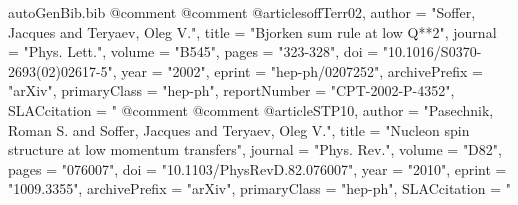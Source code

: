 \begin{filecontents*}{autoGenBib.bib}
@comment %
@comment %
@article{soffTerr02,
      author         = "Soffer, Jacques and Teryaev, Oleg V.",
      title          = "{Bjorken sum rule at low Q**2}",
      journal        = "Phys. Lett.",
      volume         = "B545",
      pages          = "323-328",
      doi            = "10.1016/S0370-2693(02)02617-5",
      year           = "2002",
      eprint         = "hep-ph/0207252",
      archivePrefix  = "arXiv",
      primaryClass   = "hep-ph",
      reportNumber   = "CPT-2002-P-4352",
      SLACcitation   = "%
}
@comment %
@comment %
@article{STP10,
      author         = "Pasechnik, Roman S. and Soffer, Jacques and Teryaev, Oleg V.",
      title          = "{Nucleon spin structure at low momentum transfers}",
      journal        = "Phys. Rev.",
      volume         = "D82",
      pages          = "076007",
      doi            = "10.1103/PhysRevD.82.076007",
      year           = "2010",
      eprint         = "1009.3355",
      archivePrefix  = "arXiv",
      primaryClass   = "hep-ph",
      SLACcitation   = "%
}





\end{filecontents*}
